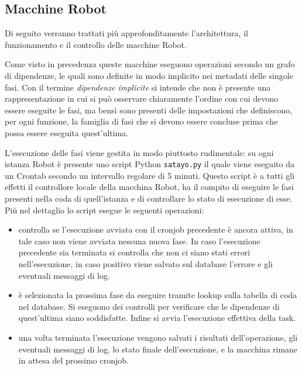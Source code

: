 \subsection{Macchine Robot}
\label{sub:robots}

Di seguito verranno trattati più approfonditamente l'architettura, il
funzionamento e il controllo delle macchine Robot.

Come visto in precedenza queste macchine eseguono operazioni secondo un grafo di
dipendenze, le quali sono definite in modo implicito nei metadati delle singole fasi.
Con il termine \textit{dipendenze implicite} si intende che non è presente una rappresentazione
in cui si può osservare chiaramente l'ordine con cui devono essere eseguite le fasi,
ma bensì sono presenti delle impostazioni che definiscono, per ogni funzione, la
famiglia di fasi che si devono essere concluse prima che possa essere eseguita
quest'ultima.

L'esecuzione delle fasi viene gestita in modo piuttosto rudimentale: su ogni istanza
Robot è presente uno script Python \texttt{satayo.py} il quale viene eseguito da
un Crontab secondo un intervallo regolare di 5 minuti. Questo script è a tutti gli
effetti il controllore locale della macchina Robot, ha il compito di eseguire le
fasi presenti nella coda di quell'istanza e di controllare lo stato di
esecuzione di esse. Più nel dettaglio lo script esegue le seguenti operazioni:

\begin{itemize}
  \item controlla se l'esecuzione avviata con il cronjob precedente è ancora attiva,
    in tale caso non viene avviata nessuna nuova fase. In caso l'esecuzione precedente
    sia terminata si controlla che non ci siano stati errori nell'esecuzione, in
    caso positivo viene salvato sul database l'errore e gli eventuali messaggi
    di log.

  \item è selezionata la prossima fase da eseguire tramite lookup sulla tabella di
    coda nel database. Si eseguono dei controlli per verificare che le
    dipendenze di quest'ultima siano soddisfatte. Infine si avvia l'esecuzione effettiva
    della task.

  \item una volta terminata l'esecuzione vengono salvati i risultati dell'operazione,
    gli eventuali messaggi di log, lo stato finale dell'esecuzione, e la
    macchina rimane in attesa del prossimo cronjob.
\end{itemize}


